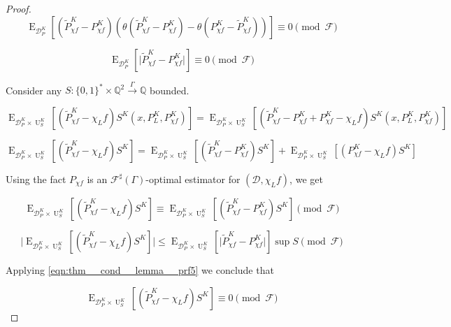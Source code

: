 \documentclass{article}
\numberwithin{equation}{section}
\theoremstyle{definition}
\theoremstyle{plain}
\newcommand{\Bool}{\{0,1\}}
\newcommand{\Words}{{\Bool^*}}
\DeclareMathOperator{\E}{E}
\DeclareMathOperator{\Un}{U}
\newcommand{\Rats}{\mathbb{Q}}
\newcommand{\Abs}[1]{\lvert #1 \rvert}
\newcommand{\Dist}{\mathcal{D}}
\newcommand{\Fall}{\mathcal{F}}
\newcommand{\ESG}{\Fall^\sharp(\Gamma)}
\newcommand{\Scheme}{\xrightarrow{\Gamma}}
\begin{document}
\begin{proof}
\[\E_{\Dist_P^K}[(\tilde{P}_{\chi f}^K - P_{\chi f}^K) (\theta(\tilde{P}_{\chi f}^K-P_{\chi f}^K)- \theta(P_{\chi f}^K - \tilde{P}_{\chi f}^K))] \equiv 0 \pmod \Fall\]

\begin{equation}
\label{eqn:thm__cond__lemma__prf5}
\E_{\Dist_P^K}[\Abs{\tilde{P}_{\chi f}^K - P_{\chi f}^K}] \equiv 0 \pmod \Fall
\end{equation}

Consider any $S: \Words \times \Rats^2 \Scheme \Rats$ bounded.

\[\E_{\Dist_P^K \times \Un_S^K}[(\tilde{P}_{\chi f}^K - \chi_L f) S^K(x,P_L^K,P_{\chi f}^K)]=\E_{\Dist_P^K \times \Un_S^K}[(\tilde{P}_{\chi f}^K - P_{\chi f}^K + P_{\chi f}^K - \chi_L f) S^K(x,P_L^K,P_{\chi f}^K)]\]

\[\E_{\Dist_P^K \times \Un_S^K}[(\tilde{P}_{\chi f}^K - \chi_L f) S^K]=\E_{\Dist_P^K \times \Un_S^K}[(\tilde{P}_{\chi f}^K - P_{\chi f}^K) S^K]+\E_{\Dist_P^K \times \Un_S^K}[( P_{\chi f}^K - \chi_L f) S^K]\]

Using the fact $P_{\chi f}$ is an $\ESG$-optimal estimator for $(\Dist, \chi_L f)$, we get

\[\E_{\Dist_P^K \times \Un_S^K}[(\tilde{P}_{\chi f}^K - \chi_L f) S^K] \equiv \E_{\Dist_P^K \times \Un_S^K}[(\tilde{P}_{\chi f}^K - P_{\chi f}^K) S^K] \pmod \Fall\]

\[\Abs{\E_{\Dist_P^K \times \Un_S^K}[(\tilde{P}_{\chi f}^K - \chi_L f) S^K]} \leq \E_{\Dist_P^K \times \Un_S^K}[\Abs{\tilde{P}_{\chi f}^K - P_{\chi f}^K}] \sup S \pmod \Fall\]

Applying \ref{eqn:thm__cond__lemma__prf5} we conclude that

\[\E_{\Dist_P^K \times \Un_S^K}[(\tilde{P}_{\chi f}^K - \chi_L f) S^K] \equiv 0 \pmod \Fall\]
%
\end{proof}
\end{document}
